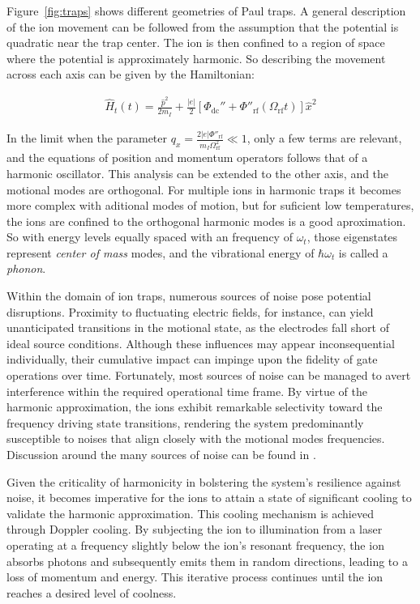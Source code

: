 \documentclass[
  journal=largetwo,
  year=2023,
]{cup-journal}
\begin{document}
Figure~\ref{fig:traps} shows different geometries of Paul traps. A general description of the ion movement \autocite{leibfried_2003_quantum} can be followed from the assumption that the potential is quadratic near the trap center. The ion is then confined to a region of space where the potential is approximately harmonic. So describing the movement across each axis can be given by the Hamiltonian:

\begin{equation}
  \begin{aligned}\label{eq:ionhamilt}
    \hat{H}_t(t) = \frac{\hat{p}^{2}}{2m_I} + \frac{|e|}{2}[\Phi_{\mathrm{dc}}'' + \Phi''_{\mathrm{rf}}(\Omega_{\mathrm{rf}}t)]\hat{x}^2
  \end{aligned}
\end{equation}

\noindent In the limit when the parameter \( q_x = \frac{2|e|\Phi''_{\mathrm{rf}}}{m_I \Omega^2_{\mathrm{rf} }} \ll 1\), only a few terms are relevant, and the equations of position and momentum operators follows that of a harmonic oscillator. This analysis can be extended to the other axis, and the motional modes are orthogonal. For multiple ions in harmonic traps it becomes more complex with aditional modes of motion, but for suficient low temperatures, the ions are confined to the orthogonal harmonic modes is a good aproximation.
So with energy levels equally spaced with an frequency of \(\omega_t\), those eigenstates represent {\it center of mass} modes, and the vibrational energy of \(\hbar\omega_t\) is called a {\it phonon}.

Within the domain of ion traps, numerous sources of noise pose potential disruptions. Proximity to fluctuating electric fields, for instance, can yield unanticipated transitions in the motional state, as the electrodes fall short of ideal source conditions. Although these influences may appear inconsequential individually, their cumulative impact can impinge upon the fidelity of gate operations over time. Fortunately, most sources of noise can be managed to avert interference within the required operational time frame. By virtue of the harmonic approximation, the ions exhibit remarkable selectivity toward the frequency driving state transitions, rendering the system predominantly susceptible to noises that align closely with the motional modes frequencies.
Discussion around the many sources of noise can be found in \autocite{brownnutt_2015_iontrap}.

Given the criticality of harmonicity in bolstering the system's resilience against noise, it becomes imperative for the ions to attain a state of significant cooling to validate the harmonic approximation. This cooling mechanism is achieved through Doppler cooling. By subjecting the ion to illumination from a laser operating at a frequency slightly below the ion's resonant frequency, the ion absorbs photons and subsequently emits them in random directions, leading to a loss of momentum and energy. This iterative process continues until the ion reaches a desired level of coolness.
\end{document}
